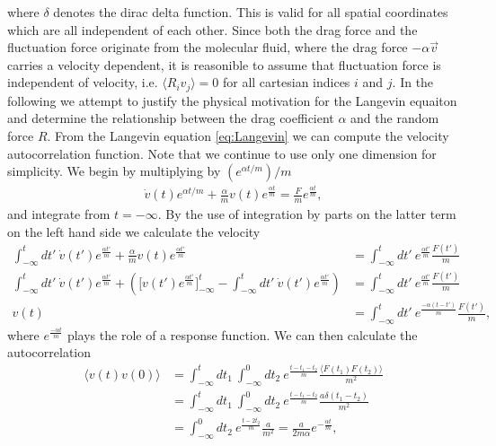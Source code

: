 where $\delta$ denotes the dirac delta function. This is valid for all spatial
coordinates which are all independent of each other. Since both the drag
force and the fluctuation force originate from the molecular fluid, where the
drag force $-\alpha \vec{v}$ carries a velocity dependent, it is reasonible to assume that fluctuation force is independent of velocity, i.e. $\langle R_i v_j \rangle = 0$ for all cartesian indices $i$ and $j$.
In the following we attempt to justify the physical motivation for the Langevin equaiton and determine the relationship between the drag coefficient $\alpha$ and
the random force $R$. From the Langevin equation \cref{eq:Langevin} we can compute the velocity autocorrelation function. Note that we continue to use only one dimension for simplicity. We begin by multiplying by $(e^{\alpha t /m})/m$
\begin{align*}
  \dot{ v}(t)e^{\alpha t /m} + \frac{\alpha}{m} v(t)e^{\frac{\alpha t}{m}}  = \frac{ F}{m}e^{\frac{\alpha t}{m}},
\end{align*}
and integrate from $t = -\infty$. By the use of integration by parts on the
latter term on the left hand side we calculate the velocity 
\begin{align*}
  \int_{-\infty}^t dt' \ \dot{ v}(t')e^{\frac{\alpha t'}{m}} + \frac{\alpha}{m} v(t)e^{\frac{\alpha t'}{m}} &=  \int_{-\infty}^t dt' \ e^{\frac{\alpha t'}{m}} \frac{ F(t')}{m}  \\
  \int_{-\infty}^t dt' \ \dot{ v}(t')e^{\frac{\alpha t'}{m}} + \left(\Big[ v(t')e^{\frac{\alpha t'}{m}}\Big]_{-\infty}^t - \int_{-\infty}^t dt' \ \dot{ v}(t')e^{\frac{\alpha t'}{m}}\right) &= \int_{-\infty}^t dt' \ e^{\frac{\alpha t'}{m}} \frac{ F(t')}{m}  \\
   v(t) &= \int_{-\infty}^t dt' \ e^{\frac{-\alpha(t - t')}{m}} \frac{ F(t')}{m},
\end{align*}
where $e^{\frac{-\alpha t}{m}}$ plays the role of a response function. We can
then calculate the autocorrelation 
\begin{align*}
  \big\langle  v(t) v(0) \big\rangle &= \int_{-\infty}^t dt_1 \ \int_{-\infty}^0 dt_2 \ e^{\frac{t - t_1 - t_2}{m}} \frac{\langle  F(t_1)  F(t_2) \rangle}{m^2} \\
  &= \int_{-\infty}^t dt_1 \ \int_{-\infty}^0 dt_2 \ e^{\frac{t - t_1 - t_2}{m}} \frac{a \delta(t_1 - t_2)}{m^2} \\
  &= \int_{-\infty}^0 dt_2 \ e^{\frac{t - 2t_2}{m}} \frac{a}{m^2} = \frac{a}{2m\alpha}e^{-\frac{\alpha t}{m}},
\end{align*}
